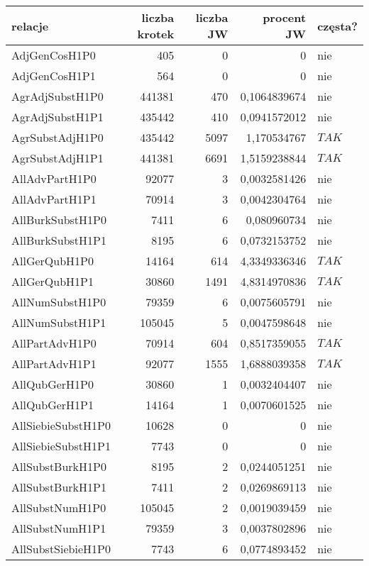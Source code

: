\begin{table}[h!]
\centering
\footnotesize\setlength{\tabcolsep}{2.5pt}
\begin{tabular}{ l | r | r | r | l }
	\toprule
	\textbf{relacje} 	& \textbf{liczba krotek} & \textbf{liczba JW} & \textbf{procent JW} & \textbf{częsta?} 	\\
	\midrule
	AdjGenCosH1P0	&	405	&	0	&	0	&	nie	\\
	AdjGenCosH1P1	&	564	&	0	&	0	&	nie	\\
	AgrAdjSubstH1P0	&	441381	&	470	&	0,1064839674	&	nie	\\
	AgrAdjSubstH1P1	&	435442	&	410	&	0,0941572012	&	nie	\\
	AgrSubstAdjH1P0	&	435442	&	5097	&	1,170534767	&	$ TAK $	\\
	AgrSubstAdjH1P1	&	441381	&	6691	&	1,5159238844	&	$ TAK $	\\
	AllAdvPartH1P0	&	92077	&	3	&	0,0032581426	&	nie	\\
	AllAdvPartH1P1	&	70914	&	3	&	0,0042304764	&	nie	\\
	AllBurkSubstH1P0	&	7411	&	6	&	0,080960734	&	nie	\\
	AllBurkSubstH1P1	&	8195	&	6	&	0,0732153752	&	nie	\\
	AllGerQubH1P0	&	14164	&	614	&	4,3349336346	&	$ TAK $	\\
	AllGerQubH1P1	&	30860	&	1491	&	4,8314970836	&	$ TAK $	\\
	AllNumSubstH1P0	&	79359	&	6	&	0,0075605791	&	nie	\\
	AllNumSubstH1P1	&	105045	&	5	&	0,0047598648	&	nie	\\
	AllPartAdvH1P0	&	70914	&	604	&	0,8517359055	&	$ TAK $	\\
	AllPartAdvH1P1	&	92077	&	1555	&	1,6888039358	&	$ TAK $	\\
	AllQubGerH1P0	&	30860	&	1	&	0,0032404407	&	nie	\\
	AllQubGerH1P1	&	14164	&	1	&	0,0070601525	&	nie	\\
	AllSiebieSubstH1P0	&	10628	&	0	&	0	&	nie	\\
	AllSiebieSubstH1P1	&	7743	&	0	&	0	&	nie	\\
	AllSubstBurkH1P0	&	8195	&	2	&	0,0244051251	&	nie	\\
	AllSubstBurkH1P1	&	7411	&	2	&	0,0269869113	&	nie	\\
	AllSubstNumH1P0	&	105045	&	2	&	0,0019039459	&	nie	\\
	AllSubstNumH1P1	&	79359	&	3	&	0,0037802896	&	nie	\\
	AllSubstSiebieH1P0	&	7743	&	6	&	0,0774893452	&	nie	\\

\end{tabular}
\end{table}
